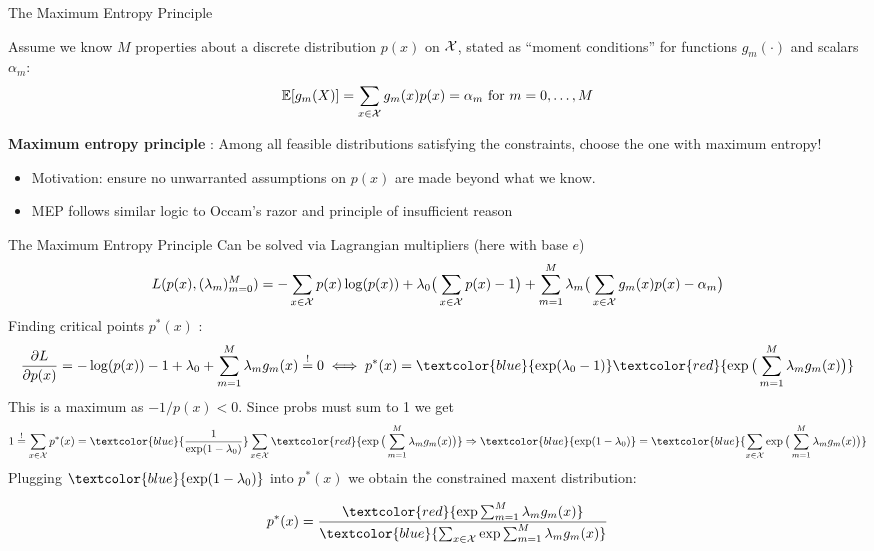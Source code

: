 \documentclass[11pt,compress,t,notes=noshow, xcolor=table]{beamer}
\begin{document}
\begin{vbframe}{The Maximum Entropy Principle}

Assume we know $M$ properties about a discrete distribution $p(x)$ on $\mathcal{X}$, stated as ``moment conditions'' for functions $g_m(\cdot)$ and scalars $\alpha_m$:
\normalsize{$$\mathbb{E}[g_m(X)]=\sum_{x \in \mathcal{X}}g_m(x)p(x) = \alpha_m\,\,\text{for}\,\, m=0,\ldots,M$$}
\vspace{-0.4cm}

\textbf{Maximum entropy principle} : Among all feasible distributions satisfying the constraints, choose the one with maximum entropy!
\begin{itemize}
    \item Motivation: ensure no unwarranted assumptions on $p(x)$ are made beyond what we know. 
    \item MEP follows similar logic to Occam's razor and principle of insufficient reason
\end{itemize}


\end{vbframe}

\begin{vbframe}{The Maximum Entropy Principle}
Can be solved via Lagrangian multipliers (here with base $e$)
\footnotesize{$$L(p(x),(\lambda_m)_{m=0}^{M}) = - \sum_{x \in \mathcal{X}} p(x) \log(p(x)) + \lambda_0 \big( \sum_{x \in \mathcal{X}} p(x) - 1 \big) + \sum_{m=1}^{M} \lambda_m \big( \sum_{x \in \mathcal{X}} g_m(x)p(x)-\alpha_m \big)$$
}
Finding critical points $p^{\ast}(x)$ :
$$\frac{\partial L}{\partial p(x)} = -\log(p(x)) -1 + \lambda_0 + \sum_{m=1}^{M} \lambda_m g_m(x) \overset{!}{=} 0 \iff p^{\ast}(x)=\textcolor{blue}{\exp(\lambda_0-1)}\textcolor{red}{
\exp\big(\sum_{m=1}^{M} \lambda_m g_m(x)\big)}$$
This is a maximum as $-1/p(x)<0$. Since probs must sum to 1 we get
{\footnotesize
$$1\overset{!}{=}\sum_{x \in \Xspace} p^{\ast}(x)=\textcolor{blue}{\frac{1}{\exp(1-\lambda_0)}} \sum_{x \in \Xspace} \textcolor{red}{\exp\big(\sum_{m=1}^{M} \lambda_m g_m(x)\big)} \Rightarrow \textcolor{blue}{\exp(1-\lambda_0)}=\textcolor{blue}{\sum_{x \in \Xspace} \exp\big(\sum_{m=1}^{M} \lambda_m g_m(x)\big)}$$
}
Plugging $\textcolor{blue}{\exp(1-\lambda_0)}$ into $p^{\ast}(x)$ we obtain the constrained maxent distribution:

$$p^{\ast}(x)=\frac{\textcolor{red}{\exp{\sum_{m=1}^{M}\lambda_m g_m(x)}}}{\textcolor{blue}{\sum_{x \in \Xspace} \exp{\sum_{m=1}^{M}\lambda_m g_m(x)}}}$$

\end{vbframe}
\end{document}
